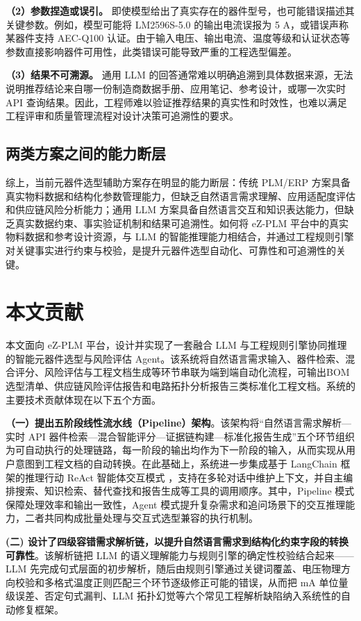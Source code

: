\textbf{（2）参数捏造或误引。} 即使模型给出了真实存在的器件型号，也可能错误描述其关键参数。例如，模型可能将 LM2596S-5.0 的输出电流误报为 5 A，或错误声称某器件支持 AEC-Q100 认证。由于输入电压、输出电流、温度等级和认证状态等参数直接影响器件可用性，此类错误可能导致严重的工程选型偏差。

\textbf{（3）结果不可溯源。} 通用 LLM 的回答通常难以明确追溯到具体数据来源，无法说明推荐结论来自哪一份制造商数据手册、应用笔记、参考设计，或哪一次实时 API 查询结果。因此，工程师难以验证推荐结果的真实性和时效性，也难以满足工程评审和质量管理流程对设计决策可追溯性的要求。

\subsection{两类方案之间的能力断层}

综上，当前元器件选型辅助方案存在明显的能力断层：传统 PLM/ERP 方案具备真实物料数据和结构化参数管理能力，但缺乏自然语言需求理解、应用适配度评估和供应链风险分析能力；通用 LLM 方案具备自然语言交互和知识表达能力，但缺乏真实数据约束、事实验证机制和结果可追溯性。如何将 eZ-PLM 平台中的真实物料数据和参考设计资源，与 LLM 的智能推理能力相结合，并通过工程规则引擎对关键事实进行约束与校验，是提升元器件选型自动化、可靠性和可追溯性的关键\cite{lewis2020rag,gao2023retrieval}。

\section{本文贡献}

本文面向 eZ-PLM 平台，设计并实现了一套融合 LLM 与工程规则引擎协同推理的智能元器件选型与风险评估 Agent。该系统将自然语言需求输入、器件检索、混合评分、风险评估与工程文档生成等环节串联为端到端自动化流程，可输出BOM选型清单、供应链风险评估报告和电路拓扑分析报告三类标准化工程文档。系统的主要技术贡献体现在以下五个方面。

\textbf{（一）提出五阶段线性流水线（Pipeline）架构}。该架构将“自然语言需求解析—实时 API 器件检索—混合智能评分—证据链构建—标准化报告生成”五个环节组织为可自动执行的处理链路，每一阶段的输出均作为下一阶段的输入，从而实现从用户意图到工程文档的自动转换。在此基础上，系统进一步集成基于 LangChain 框架的推理行动 ReAct 智能体交互模式 \cite{yao2022react}，支持在多轮对话中维护上下文，并自主编排搜索、知识检索、替代查找和报告生成等工具的调用顺序。其中，Pipeline 模式保障处理效率和输出一致性，Agent 模式提升复杂需求和追问场景下的交互推理能力，二者共同构成批量处理与交互式选型兼容的执行机制。

\textbf{(二) 设计了四级容错需求解析链，以提升自然语言需求到结构化约束字段的转换可靠性}。该解析链把 LLM 的语义理解能力与规则引擎的确定性校验结合起来——LLM 先完成句式层面的初步解析，随后由规则引擎通过关键词覆盖、电压物理方向校验和多格式温度正则匹配三个环节逐级修正可能的错误，从而把 mA 单位量级误差、否定句式漏判、LLM 拓扑幻觉等六个常见工程解析缺陷纳入系统性的自动修复框架。

